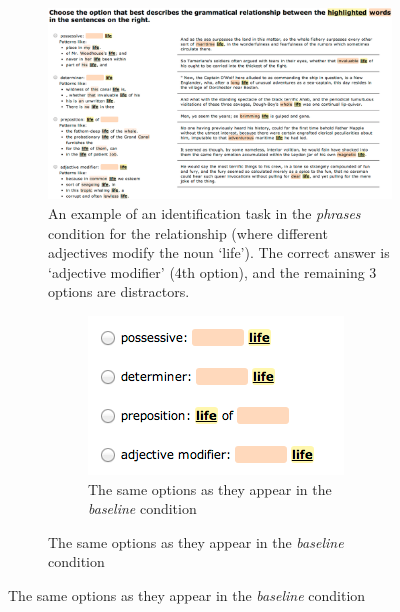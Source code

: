\begin{figure}
	\begin{subfigure} {1.3\columnwidth}
			\centering
	\includegraphics[width=1.2\columnwidth]{fig/task}
	\caption{\label{fig:task} An example of an identification task in the \emph{phrases} condition for the relationship  (where different adjectives modify the noun `life'). The correct answer is `adjective modifier' (4th option), and the remaining 3 options are distractors.}
	\end{subfigure}
	\qquad\qquad\qquad
	\begin{subfigure}{0.7\columnwidth}
		\begin{subfigure}{0.7\columnwidth}
				\centering
		\includegraphics[width=0.9\columnwidth]{fig/baseline-choices}
	    \caption {The same options as they appear in the \emph{baseline} condition \label{fig:baseline-choices}}
	    \end{subfigure}



\end{subfigure}
\end{figure}
